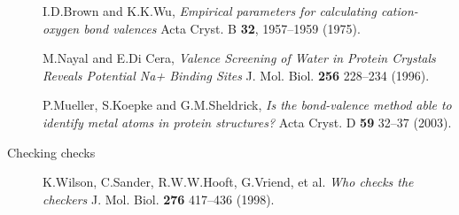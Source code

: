 \documentclass[a4paper]{article}
\begin{document}
\begin{description}
I.D.Brown and K.K.Wu,
{\em Empirical parameters for calculating cation-oxygen bond valences\/}
Acta Cryst. B {\bf 32}, 1957--1959 (1975).

M.Nayal and E.Di Cera,
{\em Valence Screening of Water in Protein Crystals Reveals Potential Na+
     Binding Sites\/}
J. Mol. Biol. {\bf 256} 228--234 (1996).

P.Mueller, S.Koepke and G.M.Sheldrick,
{\em Is the bond-valence method able to identify metal atoms in protein
     structures?\/}
Acta Cryst. D {\bf 59} 32--37 (2003).

\item [Checking checks]

K.Wilson, C.Sander, R.W.W.Hooft, G.Vriend, et al.
{\em Who checks the checkers\/}
J. Mol. Biol. {\bf 276} 417--436 (1998).

\end{description}
\end{document}
